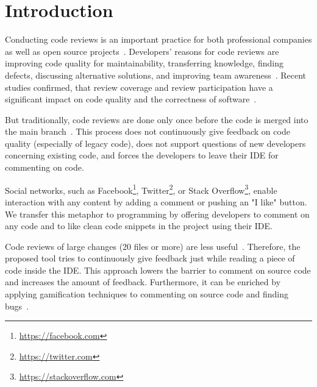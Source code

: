 
\section{Introduction}
Conducting code reviews is an important practice for both professional companies as well as open source projects~\cite{balachandran2013PeerCodeReviews, bird2015CodeReviewPlatform, rigby2013PeerCodeReviews, czerwonka2015codereviews, rigby2014PeerReviewOSS, feitelson2013development}.
%
Developers' reasons for code reviews are improving code quality for maintainability, transferring knowledge, finding defects, discussing alternative solutions, and improving team awareness~\cite{rigby2013PeerCodeReviews, bacchelli2013expectations, bosu2017ContemporaryCodeReview}.
%
Recent studies confirmed, that review coverage and review participation have a significant impact on code quality and the correctness of software~\cite{mcintosh2014impact, mcintosh2016empirical, thongtanunam2015CodeReviews, shimagaki2016CRInSony}. 
%

%
But traditionally, code reviews are done only once before the code is merged into the main branch~\cite{rigby2013PeerCodeReviews}. 
%
This process does not continuously give feedback on code quality (especially of legacy code), does not support questions of new developers concerning existing code, and forces the developers to leave their IDE for commenting on code.
%

%
Social networks, such as Facebook\footnote{\url{https://facebook.com}}, Twitter\footnote{\url{https://twitter.com}}, or Stack Overflow\footnote{\url{https://stackoverflow.com}}, enable interaction with any content by adding a comment or pushing an "I like" button.
% 
We transfer this metaphor to programming by offering developers to comment on any code and to like clean code snippets in the project using their IDE.  
%

%
Code reviews of large changes (20 files or more) are less useful~\cite{czerwonka2015codereviews}.
%
Therefore, the proposed tool tries to continuously give feedback just while reading a piece of code inside the IDE. 
%
This approach lowers the barrier to comment on source code and increases the amount of feedback.
%
Furthermore, it can be enriched by applying gamification techniques to commenting on source code and finding bugs~\cite{lotufo2012towards}.
%